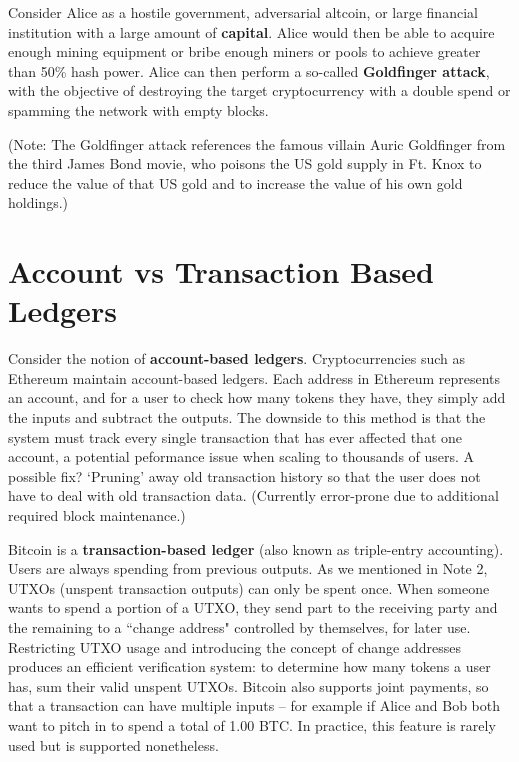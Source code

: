 \documentclass[full.tex]{subfiles}
\begin{document}
    Consider Alice as a hostile government, adversarial altcoin, or large financial institution with a large amount of \textbf{capital}. Alice would then be able to acquire enough mining equipment or bribe enough miners or pools to achieve greater than 50\% hash power. Alice can then perform a so-called \textbf{Goldfinger attack}, with the objective of destroying the target cryptocurrency with a double spend or spamming the network with empty blocks.
    
    (Note: The Goldfinger attack references the famous villain Auric Goldfinger from the third James Bond movie, who poisons the US gold supply in Ft. Knox to reduce the value of that US gold and to increase the value of his own gold holdings.)
    
    \section*{Account vs Transaction Based Ledgers}
    
    Consider the notion of \textbf{account-based ledgers}. Cryptocurrencies such as Ethereum maintain account-based ledgers. Each address in Ethereum represents an account, and for a user to check how many tokens they have, they simply add the inputs and subtract the outputs. The downside to this method is that the system must track every single transaction that has ever affected that one account, a potential peformance issue when scaling to thousands of users. A possible fix? `Pruning' away old transaction history so that the user does not have to deal with old transaction data. (Currently error-prone due to additional required block maintenance.)
    
    Bitcoin is a \textbf{transaction-based ledger} (also known as triple-entry accounting). Users are always spending from previous outputs. As we mentioned in Note 2, UTXOs (unspent transaction outputs) can only be spent once. When someone wants to spend a portion of a UTXO, they send part to the receiving party and the remaining to a ``change address" controlled by themselves, for later use. Restricting UTXO usage and introducing the concept of change addresses produces an efficient verification system: to determine how many tokens a user has, sum their valid unspent UTXOs. Bitcoin also supports joint payments, so that a transaction can have multiple inputs -- for example if Alice and Bob both want to pitch in to spend a total of 1.00 BTC. In practice, this feature is rarely used but is supported nonetheless.
    
\end{document}
